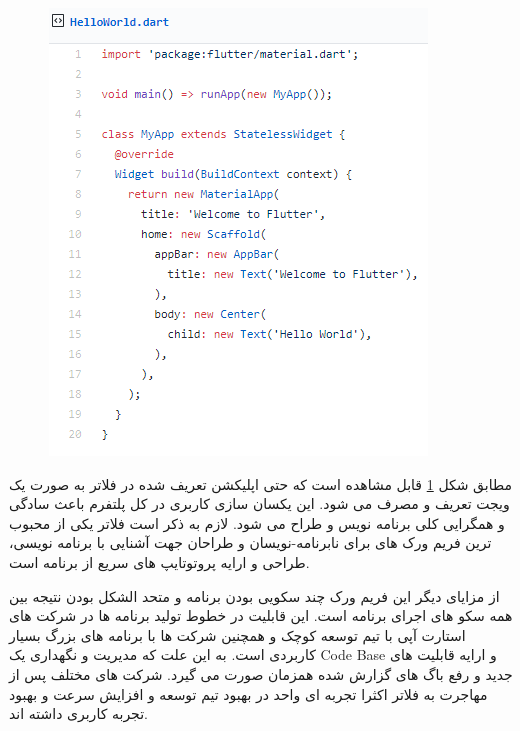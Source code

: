 \documentclass{CSICC2020}
\begin{document}
\begin{figure}[h]
\centering\includegraphics[width=\linewidth]{Images/flutter-code}
\caption{}
\label{fig:FlutterCode}
\end{figure}

مطابق شکل \ref{fig:FlutterCode} قابل مشاهده است که حتی اپلیکشن تعریف شده در فلاتر به صورت یک ویجت تعریف و مصرف می شود.
این یکسان سازی کاربری در کل پلتفرم باعث سادگی و همگرایی کلی برنامه نویس و طراح می شود.
لازم به ذکر است فلاتر یکی از محبوب ترین فریم ورک های برای نابرنامه-نویسان  و طراحان جهت آشنایی با برنامه نویسی، طراحی و ارایه پروتوتایپ های سریع از برنامه است.

از مزایای دیگر این فریم ورک چند سکویی بودن برنامه و متحد الشکل بودن نتیجه بین همه سکو های اجرای برنامه است. این قابلیت در خطوط تولید برنامه ها در شرکت های استارت آپی با تیم توسعه کوچک و همچنین شرکت ها با برنامه های بزرگ بسیار کاربردی است. به این علت که مدیریت و نگهداری یک Code Base و ارایه قابلیت های جدید و رفع باگ های گزارش شده همزمان صورت می گیرد. شرکت های مختلف پس از مهاجرت به فلاتر اکثرا تجربه ای واحد در بهبود تیم توسعه و افزایش سرعت و بهبود تجربه کاربری داشته اند. \cite{flutter-story}
\end{document}
